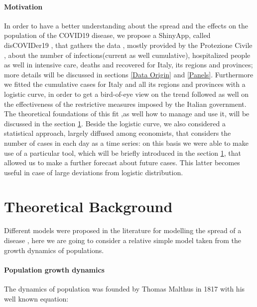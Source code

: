 \documentclass[
12pt, %
a4paper, %
oneside, %
headinclude,footinclude, %
BCOR5mm, %
]{scrartcl}
\begin{document}
\paragraph{Motivation} \label{Motivation}
In order to have a better understanding about the spread and the effects on the population of the COVID19 disease, we propose a ShinyApp, called disCOVIDer19 , that gathers  the data , mostly provided by the Protezione Civile \cite{protezionecivile+git}, about the number of infections(current as well cumulative), hospitalized people as well in intensive care, deaths and recovered for Italy, its regions and provinces; more details will be discussed in sections \ref{Data Origin} and \ref{Panels}. Furthermore we fitted the cumulative cases for Italy and all its regions and provinces with a logistic curve, in order to get a bird-of-eye view on the trend followed as well on the effectiveness of the restrictive measures imposed by the Italian government. The theoretical foundations of this fit ,as well how to manage and use it, will be discussed in the section \ref{Theoretical Background}. Beside the logistic curve, we also considered a statistical approach, largely diffused among economists, that considers the number of cases in each day as a time series: on this basis we were able to make use of a particular tool, which will be briefly introduced in the section \ref{Theoretical Background}, that allowed us to  make a further forecast  about future cases.  This latter becomes useful in case of large deviations from logistic distribution. 
 

\section{Theoretical Background} \label{Theoretical Background}
Different models were proposed in the literature for modelling the spread of a disease \cite{keeling2011modeling}, here we are going to consider a relative simple model taken from the growth dynamics of populations.

\paragraph{Population growth dynamics}
The dynamics of population was founded by Thomas Malthus in 1817 \cite{malthus1817essay} with his well known equation: 
\end{document}
